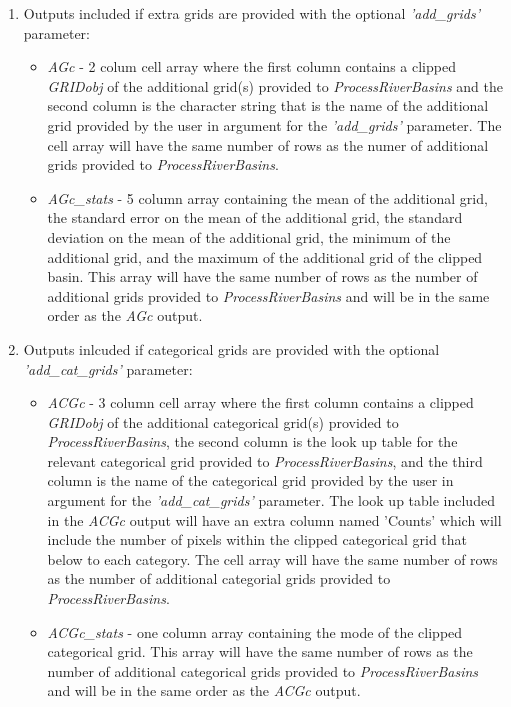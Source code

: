 \begin{enumerate}
\begin{itemize}
	\end{itemize}
	\item Outputs included if extra grids are provided with the optional \textit{'add\_grids'} parameter:
	\begin{itemize}
		\item \textit{AGc} - 2 colum cell array where the first column contains a clipped \textit{GRIDobj} of the additional grid(s) provided to \textit{ProcessRiverBasins} and the second column is the character string that is the name of the additional grid provided by the user in argument for the \textit{'add\_grids'} parameter. The cell array will have the same number of rows as the numer of additional grids provided to \textit{ProcessRiverBasins}.
		\item \textit{AGc\_stats} - 5 column array containing the mean of the additional grid, the standard error on the mean of the additional grid, the standard deviation on the mean of the additional grid, the minimum of the additional grid, and the maximum of the additional grid of the clipped basin. This array will have the same number of rows as the number of additional grids provided to \textit{ProcessRiverBasins} and will be in the same order as the \textit{AGc} output.
	\end{itemize}
	\item Outputs inlcuded if categorical grids are provided with the optional \textit{'add\_cat\_grids'} parameter:
	\begin{itemize}
		\item \textit{ACGc} - 3 column cell array where the first column contains a clipped \textit{GRIDobj} of the additional categorical grid(s) provided to \textit{ProcessRiverBasins}, the second column is the look up table for the relevant categorical grid provided to \textit{ProcessRiverBasins}, and the third column is the name of the categorical grid provided by the user in argument for the \textit{'add\_cat\_grids'} parameter. The look up table included in the \textit{ACGc} output will have an extra column named 'Counts' which will include the number of pixels within the clipped categorical grid that below to each category. The cell array will have the same number of rows as the number of additional categorial grids provided to \textit{ProcessRiverBasins}.
		\item \textit{ACGc\_stats} - one column array containing the mode of the clipped categorical grid. This array will have the same number of rows as the number of additional categorical grids provided to \textit{ProcessRiverBasins} and will be in the same order as the \textit{ACGc} output.
	\end{itemize}	
\end{enumerate}

